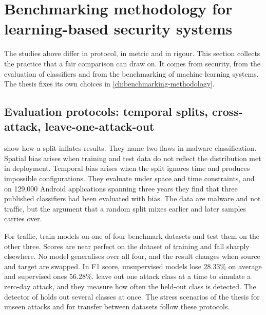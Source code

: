 \section{Benchmarking methodology for learning-based security systems}
\label{sec:benchmarking-practice}

The studies above differ in protocol, in metric and in rigour. This section
collects the practice that a fair comparison can draw on. It comes from
security, from the evaluation of classifiers and from the benchmarking of
machine learning systems. The thesis fixes its own choices in
\cref{ch:benchmarking-methodology}.

\subsection{Evaluation protocols: temporal splits, cross-attack, leave-one-attack-out}
\label{sec:evaluation-protocols}

\citet{pendlebury2019tesseract} show how a split inflates results. They name
two flaws in malware classification. Spatial bias arises when training and test
data do not reflect the distribution met in deployment. Temporal bias arises
when the split ignores time and produces impossible configurations. They
evaluate under space and time constraints, and on 129{,}000 Android
applications spanning three years they find that three published classifiers had
been evaluated with bias. The data are malware and not traffic, but the
argument that a random split mixes earlier and later samples carries over.

For traffic, \citet{layeghy2022generalisability} train models on one of four
benchmark datasets and test them on the other three. Scores are near perfect on
the dataset of training and fall sharply elsewhere. No model generalises over
all four, and the result changes when source and target are swapped.
In F1 score, unsupervised models lose 28.33\% on average and supervised ones
56.28\%.
\citet{sarhan2021zeroshot} leave out one attack class at a time to simulate a
zero-day attack, and they measure how often the held-out class is detected.
The detector of \citet{bizzarri2024nsaids} holds out several classes at once. The
stress scenarios of the thesis for unseen attacks and for transfer between
datasets follow these protocols.

